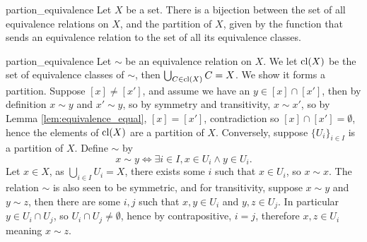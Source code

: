 \begin{cprop}{}{partion_equivalence}
    Let \( X \) be a set. There is a bijection between the set of all equivalence relations on \( X \), and the partition of \( X \), given by the function that sends an equivalence relation to the set of all its equivalence classes.
\end{cprop}
\begin{propproof}{partion_equivalence}
    Let \( \sim \) be an equivalence relation on \( X \). We let \( \operatorname{cl}(X) \) be the set of equivalence classes of \( \sim \), then \( \bigcup_{C \in \operatorname{cl}(X)} C = X\). We show it forms a partition. Suppose \( [x] \neq [x'] \), and assume we have an \( y \in [x] \cap [x'] \), then by definition \( x \sim y \) and \( x' \sim y \), so by symmetry and transitivity, \( x \sim x' \), so by Lemma \ref{lem:equivalence_equal}, \( [x] = [x'] \), contradiction so \( [x] \cap [x'] = \emptyset \), hence the elements of \( \operatorname{cl}(X) \) are a partition of \( X \). Conversely, suppose \( \{U_i\}_{i \in I} \) is a partition of \( X \). Define \( \sim \) by
    \begin{equation*}
        x \sim y \iff \exists i \in I, x \in U_i \land y \in U_i. 
    \end{equation*}
    Let \( x \in X \), as \( \bigcup_{i \in I} U_i = X \), there exists some \( i \) such that \( x \in U_i \), so \( x \sim x \). The relation \( \sim \) is also seen to be symmetric, and for transitivity, suppose \( x \sim y \) and \( y \sim z \), then there are some \( i, j \) such that \( x, y \in U_i \) and \( y, z \in U_j \). In particular \( y \in U_i \cap U_j \), so \( U_i \cap U_j \neq \emptyset \), hence by contrapositive, \( i = j \), therefore \( x, z \in U_i \) meaning \( x \sim z \).
\end{propproof}


